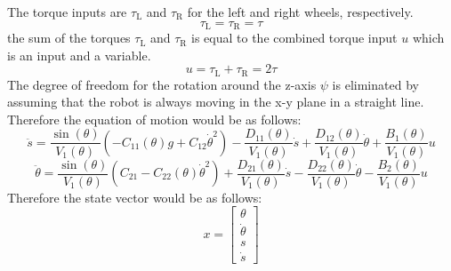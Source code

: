 The torque inputs are $\tau_{\mathrm{L}}$ and $\tau_{\mathrm{R}}$ for the left and right wheels, respectively.
\begin{equation}
    \tau_{\mathrm{L}} = \tau_{\mathrm{R}} = \tau
\end{equation}
the sum of the torques $\tau_{\mathrm{L}}$ and $\tau_{\mathrm{R}}$ is equal to the combined torque input $u$ which is an input and a variable.
\begin{equation}
    u = \tau_{\mathrm{L}} + \tau_{\mathrm{R}} = 2\tau
\end{equation}
The degree of freedom for the rotation around the z-axis $\psi$ is eliminated by assuming that the robot is always moving in the x-y plane in a straight line. Therefore the equation of motion would be as follows:
\begin{equation}
    \ddot{s} = \frac{\sin(\theta)}{V_{\mathrm{1}}(\theta)} \left( -C_{\mathrm{11}}(\theta)g + C_{\mathrm{12}}\dot{\theta}^2 \right) - \frac{D_{\mathrm{11}}(\theta)}{V_{\mathrm{1}}(\theta)}\dot{s} + \frac{D_{\mathrm{12}}(\theta)}{V_{\mathrm{1}}(\theta)}\dot{\theta} + \frac{B_{\mathrm{1}}(\theta)}{V_{\mathrm{1}}(\theta)}u
\end{equation}
\begin{equation}
    \ddot{\theta} = \frac{\sin(\theta)}{V_{\mathrm{1}}(\theta)} \left( C_{\mathrm{21}} - C_{\mathrm{22}}(\theta)\dot{\theta}^2 \right) + \frac{D_{\mathrm{21}}(\theta)}{V_{\mathrm{1}}(\theta)}\dot{s} - \frac{D_{\mathrm{22}}(\theta)}{V_{\mathrm{1}}(\theta)}\dot{\theta} - \frac{B_{\mathrm{2}}(\theta)}{V_{\mathrm{1}}(\theta)}u
\end{equation}
Therefore the state vector would be as follows:
\begin{equation}
    x = \begin{bmatrix}
        \theta \\
        \dot{\theta}\\
        s \\
        \dot{s}
    \end{bmatrix}
\end{equation}

